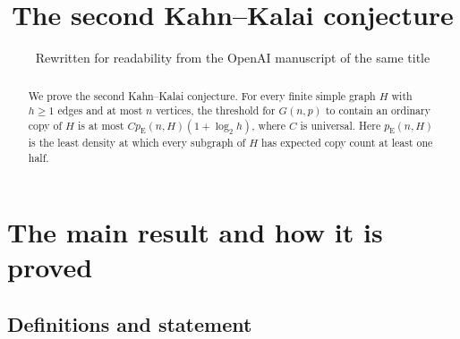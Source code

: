 \documentclass[11pt]{article}
\title{The second Kahn--Kalai conjecture}
\author{Rewritten for readability from the OpenAI manuscript of the same title}
\date{}
\numberwithin{equation}{section}
\begin{document}
\maketitle
\begin{abstract}
We prove the second Kahn--Kalai conjecture. For every finite simple graph
$H$ with $h\ge1$ edges and at most $n$ vertices, the threshold for
$G(n,p)$ to contain an ordinary copy of $H$ is at most
$C p_{\mathrm E}(n,H)(1+\log_2 h)$, where $C$ is universal.
Here $p_{\mathrm E}(n,H)$ is the least density at which every subgraph
of $H$ has expected copy count at least one half.
\end{abstract}

\section{The main result and how it is proved}\label{sec:introduction}

\subsection{Definitions and statement}
\end{document}
